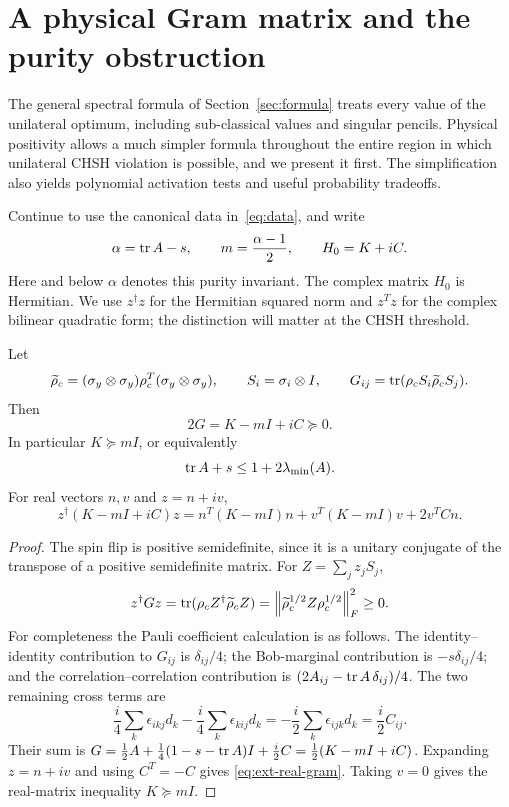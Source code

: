 \section{A physical Gram matrix and the purity obstruction}
\label{sec:ext-gram}

The general spectral formula of Section~\ref{sec:formula} treats every value of the
unilateral optimum, including sub-classical values and singular pencils. Physical
positivity allows a much simpler formula throughout the entire region in which
unilateral CHSH violation is possible, and we present it first. The simplification also yields
polynomial activation tests and useful probability tradeoffs.

Continue to use the canonical data in~\eqref{eq:data}, and write
\begin{equation}
 \alpha=\operatorname{tr} A-s,\qquad m=\frac{\alpha-1}{2},\qquad H_0=K+iC.
 \label{eq:ext-alpha}
\end{equation}
Here and below $\alpha$ denotes this purity invariant. The complex matrix
$H_0$ is Hermitian. We use $z^\dagger z$ for the Hermitian squared norm and
$z^Tz$ for the complex bilinear quadratic form; the distinction will matter
at the CHSH threshold.

\begin{lemma}
\label{lem:ext-gram}
Let
\[
 \widetilde\rho_c=(\sigma_y\otimes\sigma_y)\rho_c^T
                    (\sigma_y\otimes\sigma_y),\qquad
 S_i=\sigma_i\otimes I,
 \qquad
 G_{ij}=\operatorname{tr}(\rho_c S_i\widetilde\rho_c S_j).
\]
Then
\begin{equation}
 \boxed{\,2G=K-mI+iC\succeq0.\,}
 \label{eq:ext-gram}
\end{equation}
In particular $K\succeq mI$, or equivalently
\begin{equation}
 \operatorname{tr} A+s\le 1+2\lambda_{\min}(A).
 \label{eq:ext-canonical-physicality}
\end{equation}
For real vectors $n,v$ and $z=n+iv$,
\begin{equation}
 z^\dagger(K-mI+iC)z
 =n^T(K-mI)n+v^T(K-mI)v+2v^TCn.
 \label{eq:ext-real-gram}
\end{equation}
\end{lemma}

\begin{proof}
The spin flip is positive semidefinite, since it is a unitary conjugate of
the transpose of a positive semidefinite matrix. For $Z=\sum_jz_jS_j$,
\[
 z^\dagger Gz
 =\operatorname{tr}(\rho_c Z^\dagger\widetilde\rho_c Z)
 =\left\lVert\widetilde\rho_c^{1/2}Z\rho_c^{1/2}\right\rVert_F^2\ge0.
\]
For completeness the Pauli coefficient calculation is as follows. The
identity--identity contribution to $G_{ij}$ is $\delta_{ij}/4$; the
Bob-marginal contribution is $-s\delta_{ij}/4$; and the
correlation--correlation contribution is
$(2A_{ij}-\operatorname{tr} A\,\delta_{ij})/4$. The two remaining cross terms are
\[
 \frac{i}{4}\sum_k\epsilon_{ikj}d_k
 -\frac{i}{4}\sum_k\epsilon_{kij}d_k
 =-\frac{i}{2}\sum_k\epsilon_{ijk}d_k
 =\frac{i}{2}C_{ij}.
\]
Their sum is
$G=\tfrac12 A+\tfrac14(1-s-\operatorname{tr} A)I+\tfrac i2 C
 =\tfrac12(K-mI+iC)$.
Expanding $z=n+iv$ and using $C^T=-C$ gives
\eqref{eq:ext-real-gram}. Taking $v=0$ gives the real-matrix inequality
$K\succeq mI$.
\end{proof}

